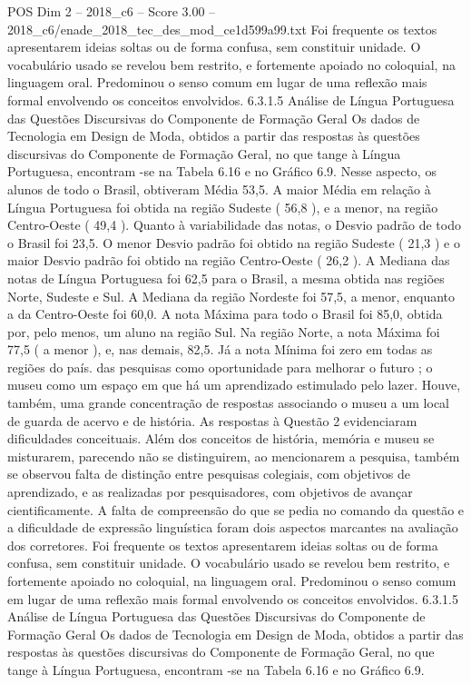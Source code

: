 \begin{textsample}{POS Dim 2 – 2018\_c6 – Score 3.00 – 2018\_c6/enade\_2018\_tec\_des\_mod\_ce1d599a99.txt}
Foi frequente os textos apresentarem ideias soltas ou de forma confusa, sem constituir unidade.
O vocabulário usado se revelou bem restrito, e fortemente apoiado no coloquial, na linguagem oral.
Predominou o senso comum em lugar de uma reflexão mais formal envolvendo os conceitos envolvidos. 6.3.1.5 Análise de Língua Portuguesa das Questões Discursivas do Componente de Formação Geral Os dados de Tecnologia em Design de Moda, obtidos a partir das respostas às questões discursivas do Componente de Formação Geral, no que tange à Língua Portuguesa, encontram -se na Tabela 6.16 e no Gráfico 6.9.
Nesse aspecto, os alunos de todo o Brasil, obtiveram Média 53,5.
A maior Média em relação à Língua Portuguesa foi obtida na região Sudeste ( 56,8 ), e a menor, na região Centro-Oeste ( 49,4 ).
Quanto à variabilidade das notas, o Desvio padrão de todo o Brasil foi 23,5.
O menor Desvio padrão foi obtido na região Sudeste ( 21,3 ) e o maior Desvio padrão foi obtido na região Centro-Oeste ( 26,2 ).
A Mediana das notas de Língua Portuguesa foi 62,5 para o Brasil, a mesma obtida nas regiões Norte, Sudeste e Sul.
A Mediana da região Nordeste foi 57,5, a menor, enquanto a da Centro-Oeste foi 60,0.
A nota Máxima para todo o Brasil foi 85,0, obtida por, pelo menos, um aluno na região Sul.
Na região Norte, a nota Máxima foi 77,5 ( a menor ), e, nas demais, 82,5.
Já a nota Mínima foi zero em todas as regiões do país. das pesquisas como oportunidade para melhorar o futuro ; o museu como um espaço em que há um aprendizado estimulado pelo lazer.
Houve, também, uma grande concentração de respostas associando o museu a um local de guarda de acervo e de história.
As respostas à Questão 2 evidenciaram dificuldades conceituais.
Além dos conceitos de história, memória e museu se misturarem, parecendo não se distinguirem, ao mencionarem a pesquisa, também se observou falta de distinção entre pesquisas colegiais, com objetivos de aprendizado, e as realizadas por pesquisadores, com objetivos de avançar cientificamente.
A falta de compreensão do que se pedia no comando da questão e a dificuldade de expressão linguística foram dois aspectos marcantes na avaliação dos corretores.
Foi frequente os textos apresentarem ideias soltas ou de forma confusa, sem constituir unidade.
O vocabulário usado se revelou bem restrito, e fortemente apoiado no coloquial, na linguagem oral.
Predominou o senso comum em lugar de uma reflexão mais formal envolvendo os conceitos envolvidos. 6.3.1.5 Análise de Língua Portuguesa das Questões Discursivas do Componente de Formação Geral Os dados de Tecnologia em Design de Moda, obtidos a partir das respostas às questões discursivas do Componente de Formação Geral, no que tange à Língua Portuguesa, encontram -se na Tabela 6.16 e no Gráfico 6.9.

\end{textsample}
